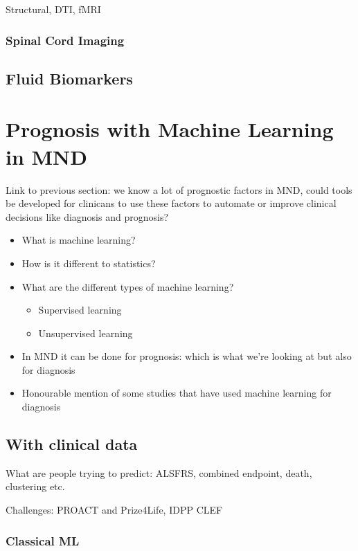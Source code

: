 Structural, DTI, fMRI

\subsubsection{Spinal Cord Imaging}

\subsection{Fluid Biomarkers}


\section{Prognosis with Machine Learning in MND}

Link to previous section: we know a lot of prognostic factors in MND, could tools be developed for clinicans to use these factors to automate or improve clinical decisions like diagnosis and prognosis?


\begin{itemize}
    \item What is machine learning?
    \item How is it different to statistics?
    \item What are the different types of machine learning?
    \begin{itemize}
        \item Supervised learning
        \item Unsupervised learning
    \end{itemize}
    \item In MND it can be done for prognosis: which is what we're looking at but also for diagnosis
    \item Honourable mention of some studies that have used machine learning for diagnosis
\end{itemize}

\subsection{With clinical data}

What are people trying to predict: ALSFRS, combined endpoint, death, clustering etc.

Challenges: PROACT and Prize4Life, IDPP CLEF

\subsubsection{Classical ML}

